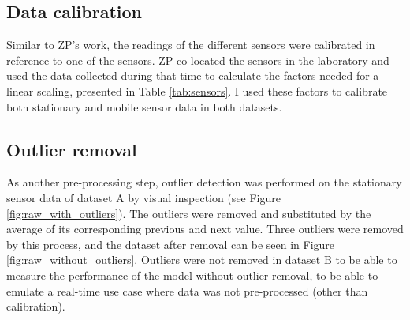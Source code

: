 \subsection{Data calibration}

Similar to ZP's work, the readings of the different sensors were calibrated in reference to one of the sensors. ZP co-located the sensors in the laboratory and used the data collected during that time to calculate the factors needed for a linear scaling, presented in Table \ref{tab:sensors}. I used these factors to calibrate both stationary and mobile sensor data in both datasets.

\subsection{Outlier removal}
As another pre-processing step, outlier detection was performed on the stationary sensor data of dataset A by visual inspection (see Figure \ref{fig:raw_with_outliers}). The outliers were removed and substituted by the average of its corresponding previous and next value. Three outliers were removed by this process, and the dataset after removal can be seen in Figure \ref{fig:raw_without_outliers}. Outliers were not removed in dataset B to be able to measure the performance of the model without outlier removal, to be able to emulate a real-time use case where data was not pre-processed (other than calibration).

